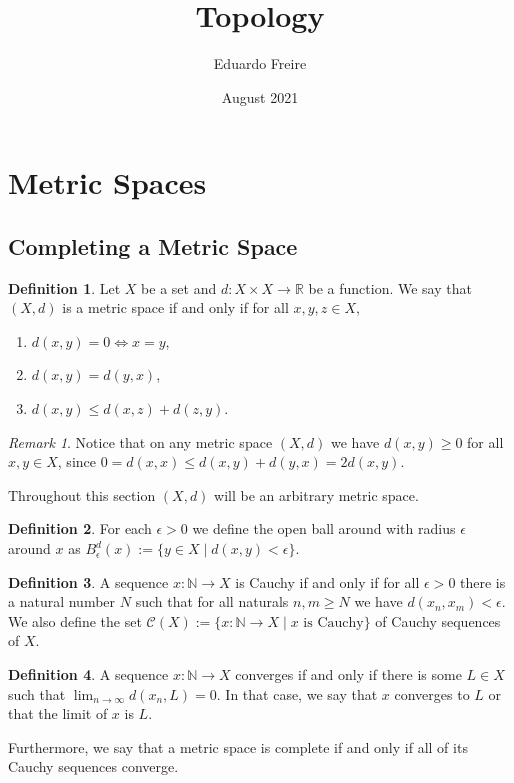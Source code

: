 \documentclass{article}
\title{Topology}
\author{Eduardo Freire}
\date{August 2021}
\theoremstyle{definition}
\newtheorem{definition}{Definition}[subsection]
\theoremstyle{remark}
\newtheorem{remark}{Remark}[subsection]
\newcommand{\N}{\mathbb{N}}
\newcommand{\R}{\mathbb{R}}
\newcommand{\set}[1]{\{#1\}}
\newcommand{\prt}[1]{\mathcal{#1}}
\begin{document}
\maketitle

\section{Metric Spaces}
\subsection{Completing a Metric Space}

\begin{definition}
   Let $X$ be a set and $d: X \times X \to \R$ be a function. We say that $(X, d)$ is a metric space if and only if for all $x,y,z \in X$,
   \begin{enumerate}
       \item $d(x, y) = 0 \iff x = y$,
       \item $d(x, y) = d(y, x)$,
       \item $d(x, y) \leq d(x, z) + d(z, y)$.
   \end{enumerate}
\end{definition}

\begin{remark}
    Notice that on any metric space $(X, d)$ we have $d(x, y) \geq 0$ for all $x, y \in X$, since
    $0 = d(x, x) \leq d(x, y) + d(y, x) = 2 d(x, y)$.
\end{remark}

Throughout this section $(X, d)$ will be an arbitrary metric space.

\begin{definition}
   For each $\epsilon > 0$ we define the open ball around with radius $\epsilon$ around $x$ as $B^d_\epsilon(x) := \set{y \in X \mid d(x, y) < \epsilon}$.
\end{definition}

\begin{definition}
   A sequence $x: \N \to X$ is Cauchy if and only if for all $\epsilon > 0$ there is a natural number $N$ such that for all naturals $n,m \geq N$ we have $d(x_n, x_m) < \epsilon$. We also define the set $\prt{C}(X) := \set{x: \N \to X \mid \text{$x$ is Cauchy}}$ of Cauchy sequences of $X$.
\end{definition}


\begin{definition}
    A sequence $x: \N \to X$ converges if and only if there is some $L \in X$ such that $\lim_{n \to \infty} d(x_n, L) = 0$. In that case, we say that $x$ converges to $L$ or that the limit of $x$ is $L$. 
    
    Furthermore, we say that a metric space is complete if and only if all of its Cauchy sequences converge.
\end{definition}
\end{document}
